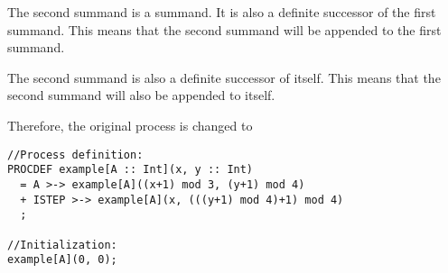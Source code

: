 The second summand is a \cistep{} summand.
It is also a definite successor of the first summand.
This means that the second summand will be appended to the first summand.

The second summand is also a definite successor of itself.
This means that the second summand will also be appended to itself.

Therefore, the original process is changed to

\begin{lstlisting}
//Process definition:
PROCDEF example[A :: Int](x, y :: Int)
  = A >-> example[A]((x+1) mod 3, (y+1) mod 4)
  + ISTEP >-> example[A](x, (((y+1) mod 4)+1) mod 4)
  ;

//Initialization:
example[A](0, 0);
\end{lstlisting}


